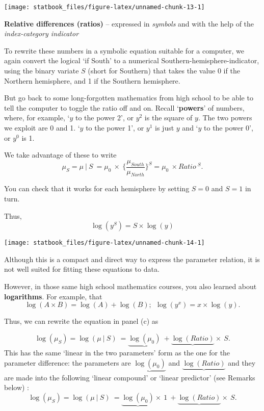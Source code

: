 \documentclass[]{book}
\begin{document}
\begin{center}\texttt{[image: statbook\_files/figure-latex/unnamed-chunk-13-1]} \end{center}

\textbf{Relative differences (ratios)} -- expressed in \emph{symbols} and with the help of the \emph{index-category indicator}

To rewrite these numbers in a symbolic equation suitable for a computer, we again convert the logical `if South' to a numerical Southern-hemisphere-indicator, using the binary variate \(S\) (short for Southern) that takes the value 0 if the Northern hemisphere, and 1 if the Southern hemisphere.

But go back to some long-forgotten mathematics from high school to be able to tell the computer to toggle the ratio off and on. Recall `\textbf{powers}' of numbers, where, for example,
`\(y\) to the power 2', or \(y^2\) is the square of \(y\). The two powers we exploit are 0 and 1.
`\(y\) to the power 1', or \(y^1\) is just \(y\) and `\(y\) to the power 0', or \(y^0\) is 1.

We take advantage of these to write
\[\mu_S = \mu \ | \ S  \ = \mu_0 \ \times \  \Big\{ \frac{\mu_{South}}{\mu_{North}}\Big\}^S = \mu_0 \ \times Ratio \ ^ S.\]

You can check that it works for each hemisphere by setting \(S=0\) and \(S=1\) in turn.

Thus, \[\log(y^S) = S \times \log(y)\]

\begin{center}\texttt{[image: statbook\_files/figure-latex/unnamed-chunk-14-1]} \end{center}

Although this is a compact and direct way to express the
parameter relation, it is not well suited for fitting these equations to data.

However, in those same high school mathematics courses, you also learned about \textbf{logarithms}. For example, that
\[\log(A \times B) = \log(A) + \log(B); \ \  \log(y^x) = x \times \log(y).\]

Thus, we can rewrite the equation in panel (c) as

\[\log(\mu_S) = \log(\mu \ | \ S)  \ = \underbrace{\log(\mu_0)} \ +  \underbrace{\log(Ratio)} \times \ S.\]
This has the same `linear in the two parameters' form as the one for the parameter difference: the parameters are
\(\underbrace{\log(\mu_0)}\) and \(\underbrace{\log(Ratio)}\) and they are made into the following `linear compound' or `linear predictor' (see Remarks below) :
\[\log(\mu_S) = \log(\mu \ | \ S)  \ = \underbrace{\log(\mu_0)} \times \ 1 \ + \underbrace{\log(Ratio)} \times \ S.\]
\end{document}
